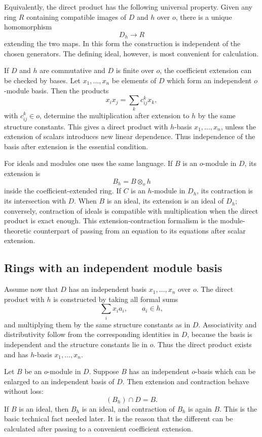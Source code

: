\documentclass[11pt]{article}
\begin{document}
Equivalently, the direct product has the following universal property. Given any ring \(R\) containing compatible images of \(D\) and \(h\) over \(o\), there is a unique homomorphism
\[
  D_h\longrightarrow R
\]
extending the two maps. In this form the construction is independent of the chosen generators. The defining ideal, however, is most convenient for calculation.

If \(D\) and \(h\) are commutative and \(D\) is finite over \(o\), the coefficient extension can be checked by bases. Let \(x_1,\ldots,x_n\) be elements of \(D\) which form an independent \(o\)-module basis. Then the products
\[
  x_ix_j=\sum_k c_{ij}^{k}x_k,
\]
with \(c_{ij}^k\in o\), determine the multiplication after extension to \(h\) by the same structure constants. This gives a direct product with \(h\)-basis \(x_1,
\ldots,x_n\), unless the extension of scalars introduces new linear dependence. Thus independence of the basis after extension is the essential condition.

For ideals and modules one uses the same language. If \(B\) is an \(o\)-module in \(D\), its extension is
\[
  B_h=B\otimes_o h
\]
inside the coefficient-extended ring. If \(C\) is an \(h\)-module in \(D_h\), its contraction is its intersection with \(D\). When \(B\) is an ideal, its extension is an ideal of \(D_h\); conversely, contraction of ideals is compatible with multiplication when the direct product is exact enough. This extension-contraction formalism is the module-theoretic counterpart of passing from an equation to its equations after scalar extension.

\subsection{Rings with an independent module basis}

Assume now that \(D\) has an independent basis \(x_1,
\ldots,x_n\) over \(o\). The direct product with \(h\) is constructed by taking all formal sums
\[
  \sum_i x_i a_i,
  \qquad a_i\in h,
\]
and multiplying them by the same structure constants as in \(D\). Associativity and distributivity follow from the corresponding identities in \(D\), because the basis is independent and the structure constants lie in \(o\). Thus the direct product exists and has \(h\)-basis \(x_1,
\ldots,x_n\).

Let \(B\) be an \(o\)-module in \(D\). Suppose \(B\) has an independent \(o\)-basis which can be enlarged to an independent basis of \(D\). Then extension and contraction behave without loss:
\[
  (B_h)\cap D=B.
\]
If \(B\) is an ideal, then \(B_h\) is an ideal, and contraction of \(B_h\) is again \(B\). This is the basic technical fact needed later. It is the reason that the different can be calculated after passing to a convenient coefficient extension.
\end{document}
